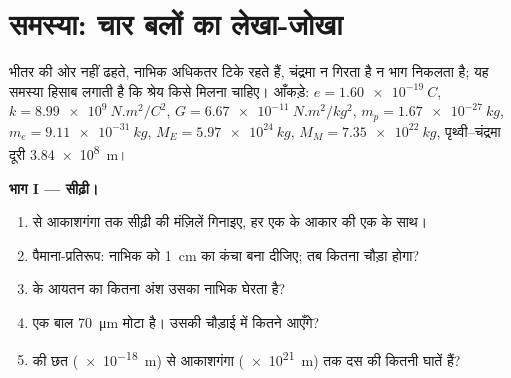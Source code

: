 \section{समस्या: चार बलों का लेखा-जोखा}

\begin{problem}
\label{pb:g11:fundamental-interactions:1}
 भीतर की ओर नहीं ढहते, नाभिक अधिकतर टिके रहते हैं, चंद्रमा न
गिरता है न भाग निकलता है; यह समस्या हिसाब लगाती है कि श्रेय किसे मिलना चाहिए।
आँकड़े: $e = \qty{1.60e-19}{C}$, $k = \qty{8.99e9}{N.m^2/C^2}$, $G = \qty{6.67e-11}{N.m^2/kg^2}$, $m_p = \qty{1.67e-27}{kg}$, $m_e = \qty{9.11e-31}{kg}$, $M_E = \qty{5.97e24}{kg}$, $M_M = \qty{7.35e22}{kg}$,
पृथ्वी--चंद्रमा दूरी \qty{3.84e8}{m}।

\medskip
\noindent\textbf{भाग I --- सीढ़ी।}
\begin{enumerate}
  \item {} से आकाशगंगा तक सीढ़ी की मंज़िलें गिनाइए, हर एक के
        आकार की एक  के साथ।
  \item पैमाना-प्रतिरूप: नाभिक को \qty{1}{cm} का कंचा बना दीजिए; तब
         कितना चौड़ा होगा?
  \item {} के आयतन का कितना अंश उसका नाभिक घेरता है?
  \item एक बाल \qty{70}{\micro m} मोटा है। उसकी चौड़ाई में कितने  आएँगे?
  \item {} की छत (\qty{e-18}{m}) से आकाशगंगा (\qty{e21}{m}) तक दस की कितनी
        घातें हैं?
\end{enumerate}


\end{problem}
